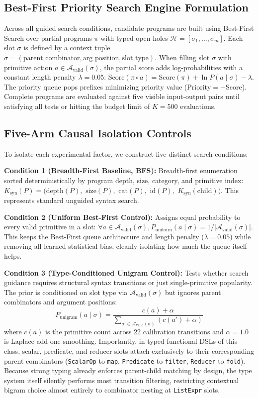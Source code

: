 \documentclass[10pt,twocolumn]{article}
\begin{document}
\subsection{Best-First Priority Search Engine Formulation}
Across all guided search conditions, candidate programs are built using Best-First Search over partial programs $\pi$ with typed open holes $\mathcal{H} = [\sigma_1, \dots, \sigma_m]$. Each slot $\sigma$ is defined by a context tuple $\sigma = (\text{parent\_combinator}, \text{arg\_position}, \text{slot\_type})$. When filling slot $\sigma$ with primitive action $a \in \mathcal{A}_{\text{valid}}(\sigma)$, the partial score adds log-probabilities with a constant length penalty $\lambda = 0.05$: $\text{Score}(\pi \circ a) = \text{Score}(\pi) + \ln P(a \mid \sigma) - \lambda$. The priority queue pops prefixes minimizing priority value ($\text{Priority} = -\text{Score}$). Complete programs are evaluated against five visible input-output pairs until satisfying all tests or hitting the budget limit of $K = 500$ evaluations.

\subsection{Five-Arm Causal Isolation Controls}
To isolate each experimental factor, we construct five distinct search conditions:

\textbf{Condition 1 (Breadth-First Baseline, BFS):} Breadth-first enumeration sorted deterministically by program depth, size, category, and primitive index: $K_{\text{syn}}(P) = (\text{depth}(P),$ $\text{size}(P),$ $\text{cat}(P),$ $\text{id}(P),$ $K_{\text{syn}}(\text{child}))$. This represents standard unguided syntax search.

\textbf{Condition 2 (Uniform Best-First Control):} Assigns equal probability to every valid primitive in a slot: $\forall a \in \mathcal{A}_{\text{valid}}(\sigma), P_{\text{uniform}}(a \mid \sigma) = 1 / |\mathcal{A}_{\text{valid}}(\sigma)|$. This keeps the Best-First queue architecture and length penalty ($\lambda = 0.05$) while removing all learned statistical bias, cleanly isolating how much the queue itself helps.

\textbf{Condition 3 (Type-Conditioned Unigram Control):} Tests whether search guidance requires structural syntax transitions or just single-primitive popularity. The prior is conditioned on slot type via $\mathcal{A}_{\text{valid}}(\sigma)$ but ignores parent combinators and argument positions:
$$P_{\text{unigram}}(a \mid \sigma) = \frac{c(a) + \alpha}{\sum_{a' \in \mathcal{A}_{\text{valid}}(\sigma)} (c(a') + \alpha)}$$
where $c(a)$ is the primitive count across 22 calibration transitions and $\alpha = 1.0$ is Laplace add-one smoothing. Importantly, in typed functional DSLs of this class, scalar, predicate, and reducer slots attach exclusively to their corresponding parent combinators (\texttt{ScalarOp} to \texttt{map}, \texttt{Predicate} to \texttt{filter}, \texttt{Reducer} to \texttt{fold}). Because strong typing already enforces parent-child matching by design, the type system itself silently performs most transition filtering, restricting contextual bigram choice almost entirely to combinator nesting at \texttt{ListExpr} slots.
\end{document}
